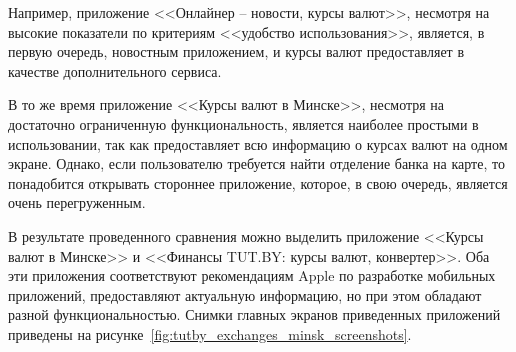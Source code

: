 Например, приложение <<Онлайнер -- новости, курсы валют>>, несмотря на высокие
показатели по критериям <<удобство использования>>, является, в первую очередь,
новостным приложением, и курсы валют предоставляет в качестве дополнительного сервиса.

В то же время приложение <<Курсы валют в Минске>>, несмотря на достаточно
ограниченную функциональность, является наиболее простыми в использовании, так как
предоставляет всю информацию о курсах валют на одном экране. Однако, если
пользователю требуется найти отделение банка на карте, то понадобится открывать
стороннее приложение, которое, в свою очередь, является очень перегруженным.

\newpage

В результате проведенного сравнения можно выделить приложение <<Курсы валют
в Минске>> и <<Финансы TUT.BY: курсы валют, конвертер>>. Оба эти приложения
соответствуют рекомендациям Apple по разработке мобильных приложений,
предоставляют актуальную информацию, но при этом обладают
разной функциональностью.
Снимки главных экранов приведенных приложений приведены на рисунке~\ref{fig:tutby_exchanges_minsk_screenshots}.

